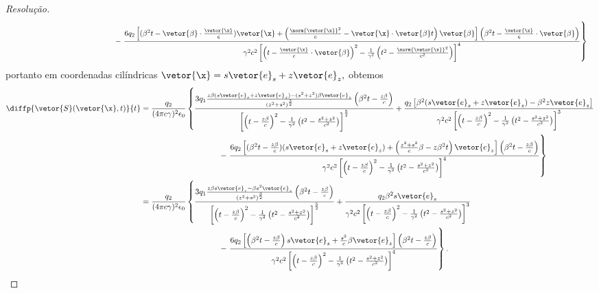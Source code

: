\begin{proof}[Resolução]
\begin{align*}
      &{} \phantom{=\frac{q_2}{(4\pi c \gamma)^2 \epsilon_0}\frac{q_2}{(4\pi c \gamma)^2 \epsilon_0}\frac{q_2}{(4\pi c \gamma)^2 \epsilon_0}}
      -\left.\frac{6q_2 \left[(\beta^2 t - \vetor{\beta} \cdot\frac{\vetor{\x}}{c})\vetor{\x} + \left(\frac{\norm{\vetor{\x}}^2}{c} - \vetor{\x} \cdot \vetor{\beta} t\right)\vetor{\beta}\right]\left(\beta^2 t - \frac{\vetor{\x}}{c} \cdot \vetor{\beta}\right)}{\gamma^2 c^2\left[\left(t - \frac{\vetor{\x}}{c} \cdot \vetor{\beta}\right)^2 - \frac{1}{\gamma^2} \left(t^2 - \frac{\norm{\vetor{\x}}^2}{c^2}\right)\right]^{4}} \right\}
   \end{align*}
   portanto em coordenadas cilíndricas \(\vetor{\x} = s \vetor{e}_s + z \vetor{e}_z,\) obtemos
   \begin{align*}
      \diffp{\vetor{S}(\vetor{\x},t)}{t} 
      &= \frac{q_2}{(4\pi c \gamma)^2 \epsilon_0} \left\{
         \frac{3q_1 \frac{z \beta(s \vetor{e}_s +z\vetor{e}_z) - (s^2 + z^2)\beta \vetor{e}_z}{(z^2 + s^2)^{\frac32}} \left(\beta^2 t - \frac{z \beta}{c}\right)}{\left[\left(t - \frac{z \beta}{c}\right)^2 - \frac{1}{\gamma^2} \left(t^2 - \frac{s^2 + z^2}{c^2}\right)\right]^{\frac52}} +
      \frac{q_2 \left[\beta^2 (s \vetor{e}_s + z \vetor{e}_z) - \beta^2 z \vetor{e}_z\right]}{\gamma^2 c^2\left[\left(t - \frac{z \beta}{c}\right)^2 - \frac{1}{\gamma^2} \left(t^2 - \frac{s^2 + z^2}{c^2}\right)\right]^{3}}\right.\\
      &{} \phantom{=\frac{q_2}{(4\pi c \gamma)^2 \epsilon_0}\frac{q_2}{(4\pi c \gamma)^2 \epsilon_0}}
      -\left.\frac{6q_2 \left[(\beta^2 t - \frac{z \beta}{c})(s \vetor{e}_s + z \vetor{e}_z) + \left(\frac{z^2 + s^2}{c}\beta - z \beta^2 t \right)\vetor{e}_z\right]\left(\beta^2 t - \frac{z \beta}{c}\right)}{\gamma^2 c^2\left[\left(t - \frac{z \beta}{c}\right)^2 - \frac{1}{\gamma^2} \left(t^2 - \frac{s^2 + z^2}{c^2}\right)\right]^{4}} \right\}\\
      &= \frac{q_2}{(4\pi c \gamma)^2 \epsilon_0} \left\{
         \frac{3q_1 \frac{z \beta s \vetor{e}_s - \beta s^2 \vetor{e}_z}{(z^2 + s^2)^{\frac32}} \left(\beta^2 t - \frac{z \beta}{c}\right)}{\left[\left(t - \frac{z \beta}{c}\right)^2 - \frac{1}{\gamma^2} \left(t^2 - \frac{s^2 + z^2}{c^2}\right)\right]^{\frac52}} +
      \frac{q_2 \beta^2 s \vetor{e}_s}{\gamma^2 c^2\left[\left(t - \frac{z \beta}{c}\right)^2 - \frac{1}{\gamma^2} \left(t^2 - \frac{s^2 + z^2}{c^2}\right)\right]^{3}}\right.\\
      &{} \phantom{=\frac{q_2}{(4\pi c \gamma)^2 \epsilon_0}\frac{q_2}{(4\pi c \gamma)^2 \epsilon_0}}
      -\left.\frac{6q_2 \left[\left(\beta^2 t - \frac{z \beta}{c}\right)s \vetor{e}_s + \frac{s^2}{c}\beta\vetor{e}_z \right]\left(\beta^2 t - \frac{z \beta}{c}\right)}{\gamma^2 c^2\left[\left(t - \frac{z \beta}{c}\right)^2 - \frac{1}{\gamma^2} \left(t^2 - \frac{s^2 + z^2}{c^2}\right)\right]^{4}} \right\}.

\end{align*}
\end{proof}
